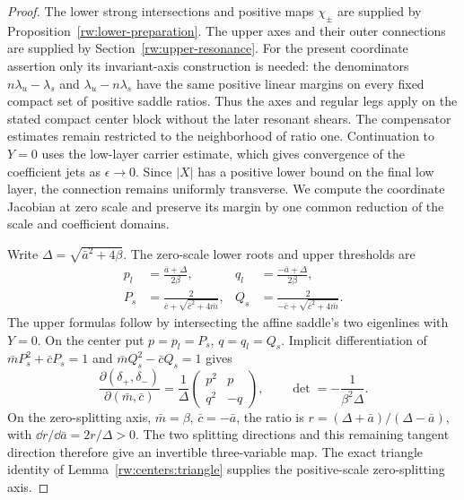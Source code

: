 \begin{proof}
The lower strong intersections and positive maps $\chi_\pm$ are
supplied by Proposition~\ref{rw:lower-preparation}. The upper axes
and their outer connections are supplied by
Section~\ref{rw:upper-resonance}. For the present coordinate assertion
only its invariant-axis construction is needed: the denominators
$n\lambda_u-\lambda_s$ and $\lambda_u-n\lambda_s$ have the same
positive linear margins on every fixed compact set of positive saddle
ratios. Thus the axes and regular legs apply on the stated compact
center block without the later resonant shears. The compensator
estimates remain restricted to the neighborhood of ratio one.
Continuation to $Y=0$ uses the low-layer carrier estimate, which gives
convergence of the coefficient jets as $\epsilon\to0$. Since $|X|$
has a positive lower bound on the final low layer, the connection
remains uniformly transverse. We compute the coordinate Jacobian at
zero scale and preserve its margin by one common reduction of the
scale and coefficient domains.

Write $\Delta=\sqrt{\bar a^2+4\beta}$. The zero-scale lower
roots and upper thresholds are
\begin{equation}\label{rw:coordinates:finite-limit}
\begin{aligned}
 p_l&=\frac{\bar a+\Delta}{2\beta},&
 q_l&=\frac{-\bar a+\Delta}{2\beta},\\
 P_s&=\frac2{\bar c+\sqrt{\bar c^2+4\bar m}},&
 Q_s&=\frac2{-\bar c+\sqrt{\bar c^2+4\bar m}}.
\end{aligned}
\end{equation}
The upper formulas follow by intersecting the affine saddle's two
eigenlines with $Y=0$. On the center put $p=p_l=P_s$, $q=q_l=Q_s$.
Implicit differentiation of
$\bar mP_s^2+\bar cP_s=1$ and
$\bar mQ_s^2-\bar cQ_s=1$ gives
\[
 \frac{\partial(\delta_+,\delta_-)}{\partial(\bar m,\bar c)}
 =\frac1\Delta
   \begin{pmatrix}p^2&p\\q^2&-q\end{pmatrix},\qquad
 \det=-\frac1{\beta^2\Delta}.
\]
On the zero-splitting axis, $\bar m=\beta$, $\bar c=-\bar a$,
the ratio is $r=(\Delta+\bar a)/(\Delta-\bar a)$, with
$\dd r/\dd\bar a=2r/\Delta>0$. The two splitting directions
and this remaining tangent direction therefore give an invertible
three-variable map. The exact triangle identity of
Lemma~\ref{rw:centers:triangle} supplies the positive-scale
zero-splitting axis.


\end{proof}
